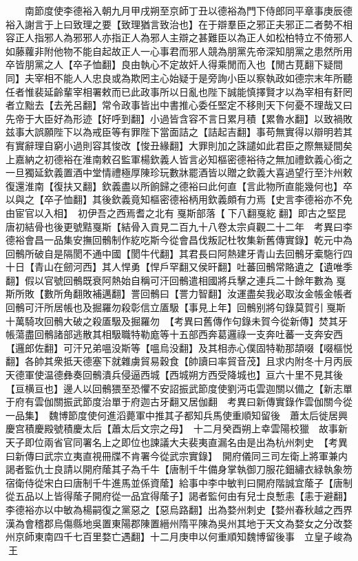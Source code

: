 　　南節度使李德裕入朝九月甲戌朔至京師丁丑以德裕為門下侍郎同平章事庚辰德裕入謝言于上曰致理之要【致理猶言致治也】在于辯羣臣之邪正夫邪正二者勢不相容正人指邪人為邪邪人亦指正人為邪人主辯之甚難臣以為正人如松柏特立不倚邪人如藤蘿非附他物不能自起故正人一心事君而邪人競為朋黨先帝深知朋黨之患然所用卒皆朋黨之人【卒子恤翻】良由執心不定故奸人得乘閒而入也【閒古莧翻下疑間同】夫宰相不能人人忠良或為欺罔主心始疑于是旁詢小臣以察執政如德宗末年所聽任者惟裴延齡輩宰相署敕而已此政事所以日亂也陛下誠能慎擇賢才以為宰相有姧罔者立黜去【去羌呂翻】常令政事皆出中書推心委任堅定不移則天下何憂不理哉又曰先帝于大臣好為形迹【好呼到翻】小過皆含容不言日累月積【累魯水翻】以致禍敗兹事大誤願陛下以為戒臣等有罪陛下當面詰之【詰起吉翻】事苟無實得以辯明若其有實辭理自窮小過則容其悛改【悛丑緣翻】大罪則加之誅譴如此君臣之際無疑間矣上嘉納之初德裕在淮南敕召監軍楊欽義人皆言必知樞密德裕待之無加禮欽義心銜之一旦獨延欽義置酒中堂情禮極厚陳珍玩數牀罷酒皆以贈之欽義大喜過望行至汴州敕復還淮南【復扶又翻】欽義盡以所餉歸之德裕曰此何直【言此物所直能幾何也】卒以與之【卒子恤翻】其後欽義竟知樞密德裕柄用欽義頗有力焉【史言李德裕亦不免由宦官以入相】　初伊吾之西焉耆之北有戛斯部落【下八翻戛紇翻】即古之堅昆唐初結骨也後更號黠戛斯【結骨入貢見二百九十八卷太宗貞觀二十二年　考異曰李德裕會昌一品集安撫回鶻制作紇吃斯今從會昌伐叛記杜牧集新舊傳實錄】乾元中為回鶻所破自是隔閡不通中國【閡牛代翻】其君長曰阿熱建牙青山去回鶻牙槖駞行四十日【青山在劒河西】其人悍勇【悍戶罕翻又侯旰翻】吐蕃回鶻常賂遺之【遺唯季翻】假以官號回鶻既衰阿熱始自稱可汗回鶻遣相國將兵擊之連兵二十餘年數為戛斯所敗【數所角翻敗補邁翻】詈回鶻曰【詈力智翻】汝運盡矣我必取汝金帳金帳者回鶻可汗所居帳也及掘羅勿殺彰信立㕎馺【事見上年】回鶻别將句錄莫賀引戛斯十萬騎攻回鶻大破之殺㕎馺及掘羅勿　【考異曰舊傳作句錄未賀今從新傳】焚其牙帳蕩盡回鶻諸部逃散其相馺職特勒庬等十五部西奔葛邏祿一支奔吐蕃一支奔安西【邏郎佐翻】可汗兄弟嗢没斯等【嗢烏没翻】及其相赤心僕固特勒那頡啜【啜樞悦翻】各帥其衆抵天德塞下就雜虜貿易穀食【帥讀曰率貿音茂】且求内附冬十月丙辰天德軍使温德彝奏回鶻潰兵侵逼西城【西城朔方西受降城也】亘六十里不見其後【亘横亘也】邊人以回鶻猥至恐懼不安詔振武節度使劉沔屯雲迦關以備之【新志單于府有雲伽關振武節度治單于府迦古牙翻又居伽翻　考異曰新傳實錄作雲伽關今從一品集】　魏博節度使何進滔薨軍中推其子都知兵馬使重順知留後　蕭太后徙居興慶宫積慶殿號積慶太后【蕭太后文宗之母】　十二月癸酉朔上幸雲陽校獵　故事新天子即位兩省官同署名上之即位也諫議大夫裴夷直漏名由是出為杭州刺史　【考異曰新傳曰武宗立夷直視冊牒不肯署今從武宗實錄】　開府儀同三司左衛上將軍兼内謁者監仇士良請以開府䕃其子為千牛【唐制千牛備身掌執御刀服花鈿繡衣緑執象笏宿衛侍從宋白曰唐制千牛進馬並係資䕃】給事中李中敏判曰開府階誠宜䕃子【唐制從五品以上皆得䕃子開府從一品宜得䕃子】謁者監何由有兒士良慙恚【恚于避翻】李德裕亦以中敏為楊嗣復之黨惡之【惡烏路翻】出為婺州刺史【婺州春秋越之西界漢為會稽郡烏傷縣地吳置東陽郡陳置縉州隋平陳為吳州其地于天文為婺女之分改婺州京師東南四千七百里婺亡遇翻】十二月庚申以何重順知魏博留後事　立皇子峻為王

